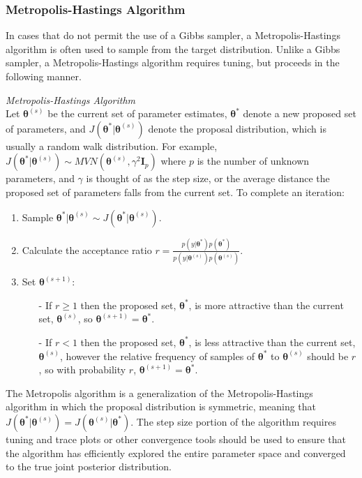 \documentclass[12pt]{article}\usepackage[]{graphicx}\usepackage[]{color}
\begin{document}
\subsubsection{Metropolis-Hastings Algorithm}

In cases that do not permit the use of a Gibbs sampler, a Metropolis-Hastings algorithm is often used to sample from the target distribution. Unlike a Gibbs sampler, a Metropolis-Hastings algorithm requires tuning, but proceeds in the following manner. 

\begin{mdframed}
\textit{Metropolis-Hastings Algorithm} \\
Let $\bm{\theta}^{(s)}$ be the current set of parameter estimates, $\bm{\theta}^*$ denote a new proposed set of parameters, and $J(\bm{\theta}^*|\bm{\theta}^{(s)})$ denote the proposal distribution, which is usually a random walk distribution. For example, $J(\bm{\theta}^*|\bm{\theta}^{(s)}) \sim MVN(\bm{\theta}^{(s)}, \gamma^2 \bm{I}_p)$ where $p$ is the number of unknown parameters, and $\gamma$ is thought of as the step size, or the average distance the proposed set of parameters falls from the current set. To complete an iteration: 
\begin{enumerate}
\item Sample $\bm{\theta}^*|\bm{\theta}^{(s)} \sim J(\bm{\theta}^*|\bm{\theta}^{(s)})$. 
\item Calculate the acceptance ratio $r = \frac{p(y|\bm{\theta}^*)p(\bm{\theta}^*)}{p(y|\bm{\theta}^{(s)})p(\bm{\theta}^{(s)})}$. 
\item Set $\bm{\theta}^{(s+1)}$:
\begin{itemize}
\item[-] If $r \geq 1$ then the proposed set, $\bm{\theta}^*$, is more attractive than the current set, $\bm{\theta}^{(s)}$, so $\bm{\theta}^{(s+1)} =   \bm{\theta}^*$. 
\item[-] If $r < 1$ then the proposed set, $\bm{\theta}^*$, is less attractive than the current set, $\bm{\theta}^{(s)}$, however the relative frequency of samples of $\bm{\theta}^*$ to $\bm{\theta}^{(s)}$ should be $r$, so with probability $r$, $\bm{\theta}^{(s+1)} = \bm{\theta}^*$.
\end{itemize}
\end{enumerate}
\end{mdframed}
  
\noindent The Metropolis algorithm is a generalization of the Metropolis-Hastings algorithm in which the proposal distribution is symmetric, meaning that $J(\bm{\theta}^*|\bm{\theta}^{(s)}) = J(\bm{\theta}^{(s)}|\bm{\theta}^*)$. The step size portion of the algorithm requires tuning and trace plots or other convergence tools should be used to ensure that the algorithm has efficiently explored the entire parameter space and converged to the true joint posterior distribution. 
\end{document}
